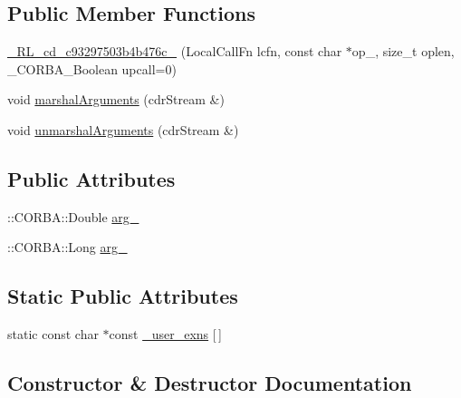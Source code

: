 \subsection*{Public Member Functions}
\begin{DoxyCompactItemize}
\item 
\hyperlink{class__0_r_l__cd__c93297503b4b476c__91000000_a0e586cea7a8d8ceb0da962954cefd98a}{\+\_\+R\+L\+\_\+cd\+\_\+c93297503b4b476c\+\_} (Local\+Call\+Fn lcfn, const char $\ast$op\+\_\+, size\+\_\+t oplen, \+\_\+\+C\+O\+R\+B\+A\+\_\+\+Boolean upcall=0)
\item 
void \hyperlink{class__0_r_l__cd__c93297503b4b476c__91000000_aeb147953bf0294500d507dff3bef0bf2}{marshal\+Arguments} (cdr\+Stream \&)
\item 
void \hyperlink{class__0_r_l__cd__c93297503b4b476c__91000000_a49bf2f2e30667c7fcfa189c0568abaa6}{unmarshal\+Arguments} (cdr\+Stream \&)
\end{DoxyCompactItemize}
\subsection*{Public Attributes}
\begin{DoxyCompactItemize}
\item 
\+::C\+O\+R\+B\+A\+::\+Double \hyperlink{class__0_r_l__cd__c93297503b4b476c__91000000_a87b6d297a7f1a56579d8d3fb6c3070f9}{arg\+\_}
\item 
\+::C\+O\+R\+B\+A\+::\+Long \hyperlink{class__0_r_l__cd__c93297503b4b476c__91000000_a48914b58e05510223789862d5cbd7ec3}{arg\+\_}
\end{DoxyCompactItemize}
\subsection*{Static Public Attributes}
\begin{DoxyCompactItemize}
\item 
static const char $\ast$const \hyperlink{class__0_r_l__cd__c93297503b4b476c__91000000_aa63022c9794a1db3032cf14c0946369e}{\+\_\+user\+\_\+exns} \mbox{[}$\,$\mbox{]}
\end{DoxyCompactItemize}


\subsection{Constructor \& Destructor Documentation}
